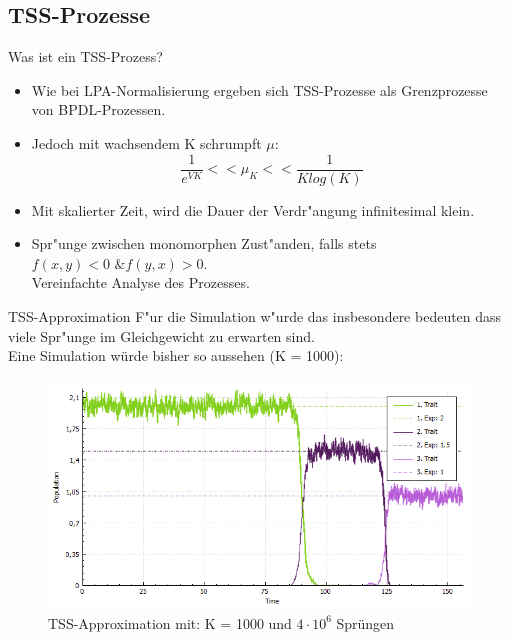 \documentclass{beamer}
\begin{document}
\subsection{TSS-Prozesse}
\begin{frame}{Was ist ein TSS-Prozess?}
	\begin{itemize}
		\item Wie bei LPA-Normalisierung ergeben sich TSS-Prozesse als Grenzprozesse von BPDL-Prozessen.
		\pause
		\item Jedoch mit wachsendem K schrumpft $ \mu $:
		\[ \frac{1}{e^{VK}} << \mu_K << \frac{1}{K log(K)} \]
		\pause
		\item Mit skalierter Zeit, wird die Dauer der Verdr"angung infinitesimal klein.
		\pause
		\item Spr"unge zwischen monomorphen Zust"anden, falls stets $ f(x,y) < 0 \text{ \& } f(y,x) > 0 $.\\
		Vereinfachte Analyse des Prozesses.
	\end{itemize}
\end{frame}

\begin{frame}{TSS-Approximation}
	F"ur die Simulation w"urde das insbesondere bedeuten dass viele Spr"unge im Gleichgewicht zu erwarten sind.\\\pause
	Eine Simulation würde bisher so aussehen (K = 1000):
	\begin{figure}[H]
		\centering
		\includegraphics[width=0.8\linewidth]{./Pictures/TSS2_pure_small}
		\caption[TSS Approximation wechselnder Dominanz]{TSS-Approximation mit: K = 1000 und $ 4 \cdot 10^6 $ Sprüngen}
	\end{figure}
\end{frame}
\end{document}
